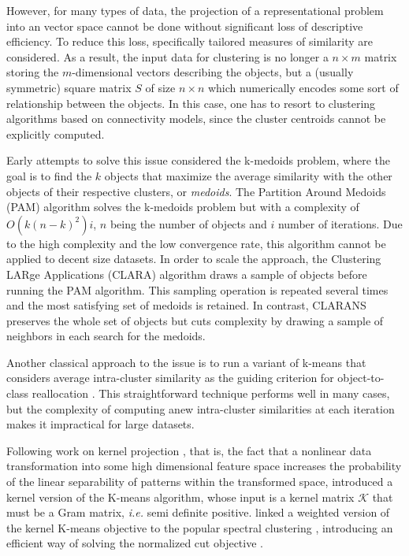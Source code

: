 \documentclass[natbib,smallextended]{svjour3}
\begin{document}
However, for many types of data, the projection of a representational problem into an vector space cannot be done without significant loss of descriptive efficiency. To reduce this loss, specifically tailored measures of similarity are considered. As a result, the input data for clustering is no longer a $n \times m$ matrix storing the $m$-dimensional vectors describing the objects, but a (usually symmetric) square matrix $S$ of size $n \times n$ which numerically encodes some sort of relationship between the objects. In this case, one has to resort to clustering algorithms based on connectivity models, since the cluster centroids cannot be explicitly computed.

Early attempts to solve this issue considered the k-medoids problem, where the goal is to find the $k$ objects that maximize the average similarity with the other objects of their respective clusters, or \emph{medoids}. The Partition Around Medoids (PAM) algorithm \citep{KaufmanRousseeuw90} solves the k-medoids problem but with a complexity of $O(k(n-k)^2)i$, $n$ being the number of objects and $i$ number of iterations. Due to the high complexity and the low convergence rate, this algorithm cannot be applied to decent size datasets. In order to scale the approach, the Clustering LARge Applications (CLARA) algorithm \citep{KaufmanRousseeuw90} draws a sample of objects before running the PAM algorithm. This sampling operation is repeated several times and the most satisfying set of medoids is retained. In contrast, CLARANS \citep{Ng:1994:EEC:645920.672827} preserves the whole set of objects but cuts complexity by  drawing a sample of neighbors in each search for the medoids.


Another classical approach to the issue is to run a variant of k-means that considers average intra-cluster similarity as the guiding criterion for object-to-class reallocation \citep[Chapter 10.7]{Duda01}. This straightforward technique performs well in many cases, but the complexity of computing anew intra-cluster similarities at each iteration makes it impractical for large datasets.

Following work on kernel projection \citep{Vapnik:1995:NSL:211359}, that is, the fact that a nonlinear data transformation into some high dimensional feature space increases the probability of the linear separability of patterns within the transformed space, \citet{Girolami:2002:MKC:2325785.2326903} introduced a kernel version of the K-means algorithm, whose input is a kernel matrix $\mathcal{K}$ that must be a Gram matrix, \textit{i.e.} semi definite positive. \citet{Dhillon:2007:WGC:1313055.1313291} linked a weighted version of the kernel K-means objective to the popular spectral clustering \cite{von2007tutorial}, introducing an efficient way of solving the normalized cut objective \cite{shi2000normalized}.
\end{document}
